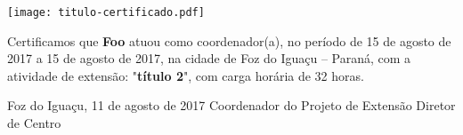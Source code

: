 \documentclass[a4paper,brazil]{article}%
\begin{document}
%
\footnotesize%
\setmainfont[SizeFeatures={Size=16}]{Latin Modern Sans}%
\pagestyle{empty}%
\BgThispage%
\vspace*{2cm}%
\begin{flushright}%
\texttt{[image: titulo-certificado.pdf]}%
\linebreak%
\end{flushright}%
\vspace*{-1cm}%
\Large%


    Certificamos que \textbf{Foo} atuou como coordenador(a), no período de 15 de agosto de 2017 a 15 de agosto de 2017, na cidade de Foz do Iguaçu -- Paraná, com a atividade de extensão: "\textbf{título 2}", com carga horária de 32 horas.

\vspace*{1.5cm}%
\hspace*{7cm}%
\begin{minipage}{\widthof{Foz do Iguaçu, 11 de agosto de 2017}}%
\begin{center}%
Foz do Iguaçu, 11 de agosto de 2017%
\newline%
\newline%
\newline%
Coordenador do Projeto de Extensão%
\newline%
\newline%
\newline%
Diretor de Centro%
\end{center}%
\end{minipage}%
\end{document}

